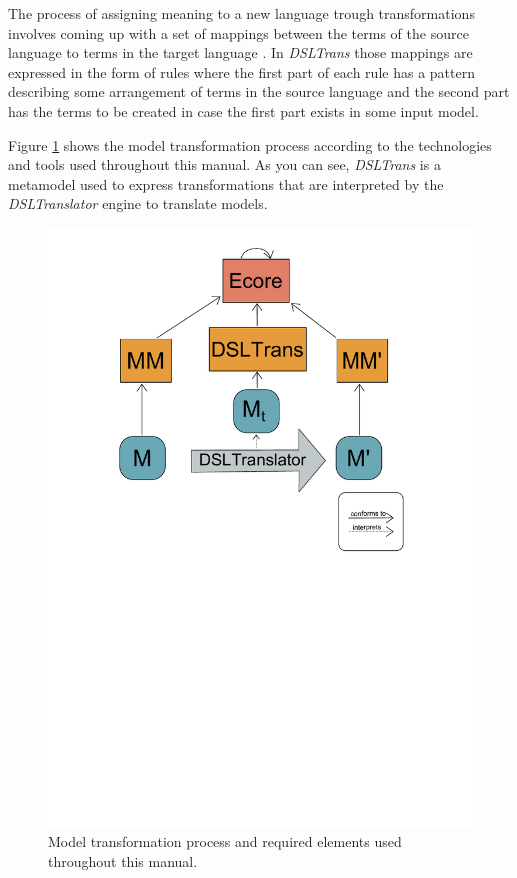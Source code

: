 The process of assigning meaning to a new language trough transformations
involves coming up with a set of mappings between the terms of the source
language to terms in the target language \cite{dsltranslator}. In \emph{DSLTrans} those
mappings are expressed in the form of rules where the first part of each rule
has a pattern describing some arrangement of terms in the source language and
the second part has the terms to be created in case the first part exists in
some input model.

Figure \ref{fig:model_trans_manual} shows the model transformation process
according to the technologies and tools used throughout this manual. As you can
see, \emph{DSLTrans} is a metamodel used to express transformations that are
interpreted by the \emph{DSLTranslator} engine to translate models.


\begin{figure}[h]
\begin{center}
  \includegraphics[scale=0.6, trim=3.3cm 13.6cm 3.1cm 0.7cm,
  clip]{imgs/model_transformation_dsltrans.pdf}
  \caption{Model transformation process and required elements used throughout
  this manual.}
  \label{fig:model_trans_manual}
\end{center}
\end{figure}

